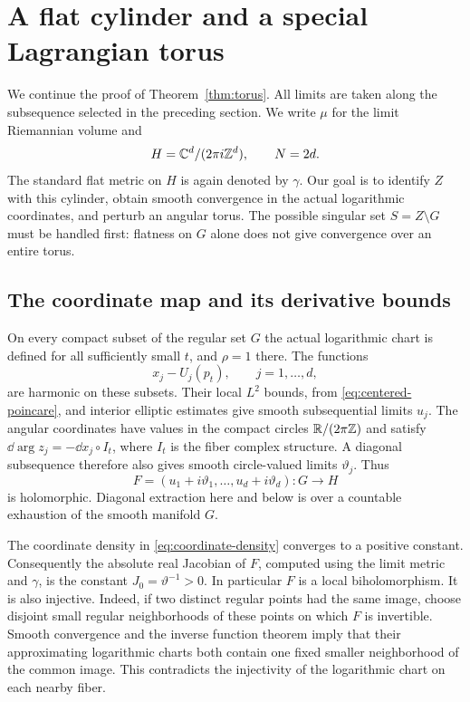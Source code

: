 \section{A flat cylinder and a special Lagrangian torus}
\label{sec:completion}

We continue the proof of Theorem~\ref{thm:torus}. All limits are taken along
the subsequence selected in the preceding section. We write $\mu$ for the
limit Riemannian volume and
\[
        H=\mathbb C^d/(2\pi i\mathbb Z^d),\qquad N=2d.
\]
The standard flat metric on $H$ is again denoted by $\gamma$.
Our goal is to identify $Z$ with this cylinder, obtain smooth convergence
in the actual logarithmic coordinates, and perturb an angular torus.
The possible singular set $S=Z\setminus G$ must be handled first:
flatness on $G$ alone does not give convergence over an entire torus.

\subsection{The coordinate map and its derivative bounds}

On every compact subset of the regular set $G$ the actual logarithmic
chart is defined for all sufficiently small $t$, and $\rho=1$ there.
The functions
\[
       x_j-U_j(p_t),\qquad j=1,\ldots,d,
\]
are harmonic on these subsets. Their local $L^2$ bounds, from
\eqref{eq:centered-poincare}, and interior elliptic estimates give smooth
subsequential limits $u_j$. The angular coordinates have values in the
compact circles $\mathbb R/(2\pi\mathbb Z)$ and satisfy
$\dd\arg z_j=-\dd x_j\circ I_t$, where $I_t$ is the fiber complex
structure. A diagonal subsequence therefore also gives smooth
circle-valued limits $\vartheta_j$. Thus
\begin{equation}
 F=(u_1+i\vartheta_1,\ldots,u_d+i\vartheta_d):G\longrightarrow H
 \label{eq:limit-map}
\end{equation}
is holomorphic. Diagonal extraction here and below is over a countable
exhaustion of the smooth manifold $G$.

The coordinate density in \eqref{eq:coordinate-density} converges to
a positive constant. Consequently the absolute real Jacobian of $F$,
computed using the limit metric and $\gamma$, is the constant
$J_0=\vartheta^{-1}>0$.
In particular $F$ is a local biholomorphism. It is also injective.
Indeed, if two distinct regular points had the same image, choose
disjoint small regular neighborhoods of these points on which $F$ is
invertible. Smooth convergence and the inverse function theorem imply
that their approximating logarithmic charts both contain one fixed
smaller neighborhood of the common image. This contradicts the
injectivity of the logarithmic chart on each nearby fiber.


